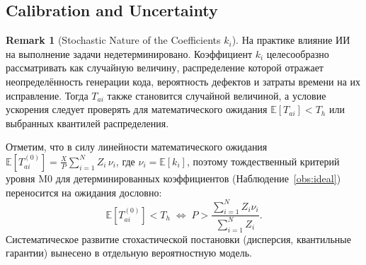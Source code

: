 \documentclass[12pt,a4paper]{article}
\theoremstyle{definition}
\newtheorem{remark}{Remark}
\begin{document}
\subsection{Calibration and Uncertainty}

\begin{remark}[Stochastic Nature of the Coefficients $k_i$]\label{rem:stochastic}
На практике влияние ИИ на выполнение задачи недетерминировано. Коэффициент $k_i$ целесообразно рассматривать как случайную величину, распределение которой отражает неопределённость генерации кода, вероятность дефектов и затраты времени на их исправление. Тогда $T_{ai}$ также становится случайной величиной, а условие ускорения следует проверять для математического ожидания $\mathbb{E}[T_{ai}] < T_h$ или выбранных квантилей распределения.

Отметим, что в силу линейности математического ожидания $\mathbb{E}[T_{ai}^{(0)}] = \frac{X}{P}\sum_{i=1}^{N} Z_i\,\nu_i$, где $\nu_i = \mathbb{E}[k_i]$, поэтому тождественный критерий уровня M0 для детерминированных коэффициентов (Наблюдение~\ref{obs:ideal}) переносится на ожидания дословно:
\[
  \mathbb{E}[T_{ai}^{(0)}] < T_h \;\iff\; P > \frac{\sum_{i=1}^{N} Z_i \nu_i}{\sum_{i=1}^{N} Z_i}.
\]
Систематическое развитие стохастической постановки (дисперсия, квантильные гарантии) вынесено в отдельную вероятностную модель.
\end{remark}
\end{document}
